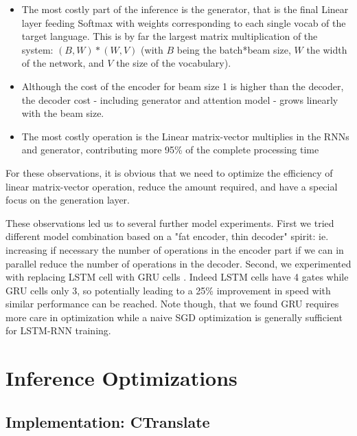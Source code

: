 \documentclass[11pt,a4paper]{article}
\begin{document}
\begin{itemize}
\item The most costly part of the inference is the generator, that is the final Linear layer feeding Softmax with weights corresponding to each single vocab of the target language. This is by far the largest matrix multiplication of the system: $(B,W) * (W,V)$ (with $B$ being the batch*beam size, $W$ the width of the network, and $V$ the size of the vocabulary).
\item Although the cost of the encoder for beam size 1 is higher than the decoder, the decoder cost - including generator and attention model - grows linearly with the beam size.
\item The most costly operation is the Linear matrix-vector multiplies in the RNNs and generator,
  contributing more 95\% of the complete processing time
\end{itemize}

For these observations, it is obvious that we need to optimize the
efficiency of linear matrix-vector operation, reduce the amount
required, and have a special focus on the generation layer.

These observations led us to several further model experiments.  First
we tried different model combination based on a "fat encoder, thin
decoder" spirit: ie. increasing if necessary the number of operations
in the encoder part if we can in parallel reduce the number of
operations in the decoder. Second, we experimented with replacing LSTM
cell with GRU cells \cite{DBLP:journals/corr/ChoMGBSB14}. Indeed LSTM
cells have 4 gates while GRU cells only 3, so potentially leading to a
25\% improvement in speed with similar performance can be
reached. Note though, that we found GRU requires more care in optimization
while a naive SGD optimization is generally sufficient for
LSTM-RNN training.

\section{Inference Optimizations}




\subsection{Implementation: CTranslate}
\end{document}
